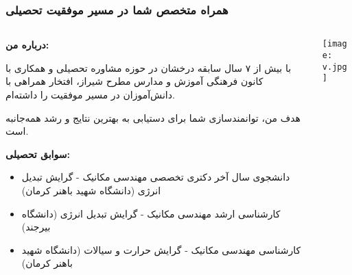 \documentclass[aspectratio=169]{beamer}
\begin{document}
\begin{frame}[fragile]
  \frametitle{همراه متخصص شما در مسیر موفقیت تحصیلی}

  \begin{columns}[T,totalwidth=\textwidth] %
    \begin{column}{0.62\textwidth} %
      \small %
      \hfill\textbf{درباره من:}\hfill\mbox{}
      \par
      با بیش از ۷ سال سابقه درخشان در حوزه مشاوره تحصیلی و همکاری با کانون فرهنگی آموزش و مدارس مطرح شیراز، افتخار همراهی با دانش‌آموزان در مسیر موفقیت را داشته‌ام.
      \par
      هدف من، توانمندسازی شما برای دستیابی به بهترین نتایج و رشد همه‌جانبه است.
      \smallskip

      \hfill\textbf{سوابق تحصیلی:}\hfill\mbox{}
      \begin{itemize}\setlength{\itemsep}{0pt}\setlength{\parskip}{0pt} %
        \item دانشجوی سال آخر دکتری تخصصی مهندسی مکانیک - گرایش تبدیل انرژی (دانشگاه شهید باهنر کرمان)
        \item کارشناسی ارشد مهندسی مکانیک - گرایش تبدیل انرژی (دانشگاه بیرجند)
        \item کارشناسی مهندسی مکانیک - گرایش حرارت و سیالات (دانشگاه شهید باهنر کرمان)
      \end{itemize}
      \normalsize %
    \end{column}

    \begin{column}{0.35\textwidth} %
      \vspace{0.5cm} %
      \centering %
      \texttt{[image: v.jpg]} %
      \vspace{0.5cm} %
    \end{column}
  \end{columns}
\end{frame}
\end{document}
